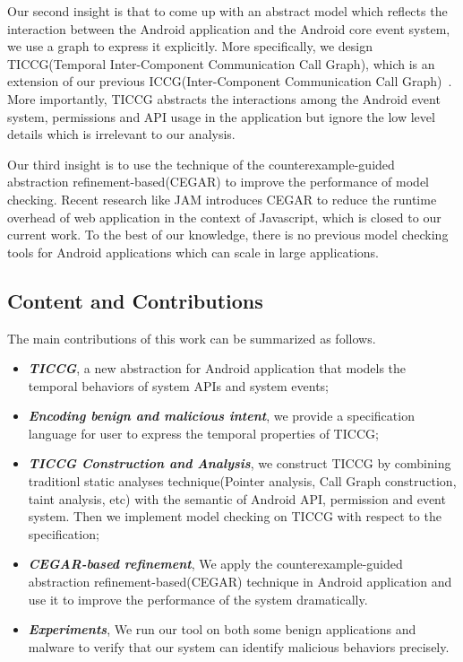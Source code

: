 \documentclass{article}
\begin{document}
Our second insight is that to come up with an abstract model which reflects
the interaction between the Android application and the Android core event 
system, we use a graph to express it explicitly. More specifically, we 
design TICCG(Temporal Inter-Component Communication Call Graph), which is
an extension of our previous ICCG(Inter-Component Communication Call Graph)~\cite{apposcopy}.
More importantly, TICCG abstracts the interactions among the Android event
system, permissions and API usage in the application but ignore the low
level details which is irrelevant to our analysis.

Our third insight is to use the technique of the counterexample-guided 
abstraction refinement-based(CEGAR) to improve the performance of 
model checking. Recent research like JAM\cite{cegar12} introduces CEGAR 
to reduce the runtime overhead of web application in the context of 
Javascript, which is closed to our current work.
To the best of our knowledge, there is no previous model checking tools for 
Android applications which can scale in large applications.

\subsection{Content and Contributions}
The main contributions of this work can be summarized as follows.
\begin{itemize}
\item {\bf \emph{TICCG}}, a new abstraction for Android application
that models the temporal behaviors of system APIs and system events;
\item {\bf \emph{Encoding benign and malicious intent}}, we provide a specification
language for user to express the temporal properties of TICCG; 
\item {\bf \emph{TICCG Construction and Analysis}}, we construct TICCG by combining 
traditionl static analyses technique(Pointer analysis, Call Graph construction, taint analysis, etc)
with the semantic of Android API, permission and event system. Then we implement
model checking on TICCG with respect to the specification;
\item {\bf \emph{CEGAR-based refinement}}, We apply the counterexample-guided 
abstraction refinement-based(CEGAR) technique in Android application 
and use it to improve the performance of the system dramatically.
\item {\bf \emph{Experiments}}, We run our tool on both some benign applications and 
malware to verify that our system can identify malicious behaviors precisely.
\end{itemize}
\end{document}
